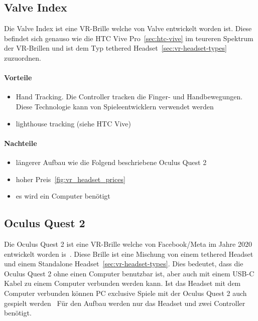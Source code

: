 \subsection{Valve Index}

Die Valve Index ist eine VR-Brille welche von Valve entwickelt worden ist.
Diese befindet sich genauso wie die HTC Vive Pro~\ref{sec:htc-vive} im teureren Spektrum~\cite{ALSOP_2019} der VR-Brillen und ist dem Typ tethered Headset~\ref{sec:vr-headset-types} zuzuordnen.

\paragraph{Vorteile}

\begin{itemize}
    \item Hand Tracking.
    Die Controller tracken die Finger- und Handbewegungen.
    Diese Technologie kann von Spieleentwicklern verwendet werden~\cite{SadlyItsBradley_2019}
    \item lighthouse tracking (siehe HTC Vive)
\end{itemize}

\paragraph{Nachteile}

\begin{itemize}
    \item längerer Aufbau wie die Folgend beschriebene Oculus Quest 2
    \item hoher Preis~\ref{fig:vr_headset_prices}
    \item es wird ein Computer benötigt
\end{itemize}

\subsection{Oculus Quest 2}\label{sec:oculus-quest-2}

Die Oculus Quest 2 ist eine VR-Brille welche von Facebook/Meta im Jahre 2020 entwickelt worden is~\cite{ADI_ROBERTSON_2020}.
Diese Brille ist eine Mischung von einem tethered Headset und einem Standalone Headset~\ref{sec:vr-headset-types}.
Dies bedeutet, dass die Oculus Quest 2 ohne einen Computer benutzbar ist, aber auch mit einem USB-C Kabel zu einem Computer verbunden werden kann.
Ist das Headset mit dem Computer verbunden können PC exclusive Spiele mit der Oculus Quest 2 auch gespielt werden~\cite{ADI_ROBERTSON_2020}
Für den Aufbau werden nur das Headset und zwei Controller benötigt.

